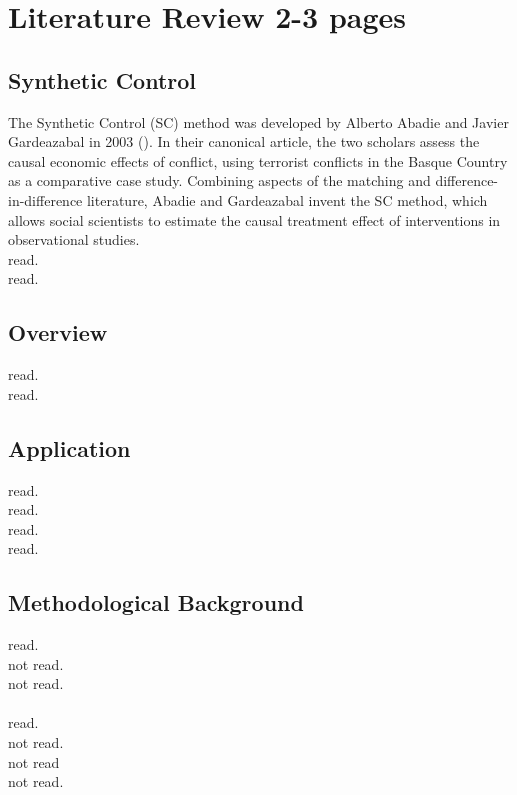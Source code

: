 \section{Literature Review 2-3 pages}

\subsection{Synthetic Control}
The Synthetic Control (SC) method was developed by Alberto Abadie and Javier Gardeazabal in 2003 (\cite{abadie:2003}). In their canonical article, the two scholars assess the causal economic effects of conflict, using terrorist conflicts in the Basque Country as a comparative case study. Combining aspects of the matching and difference-in-difference literature, Abadie and Gardeazabal invent the SC method, which allows social scientists to estimate the causal treatment effect of interventions in observational studies. 
\\
\cite{abadie:2007} read.\\
\cite{abadie:2015} read.

\subsection{Overview}
\cite{abadie:2021a} read.\\
\cite{athey:2016} read.

\subsection{Application}
\cite{born:2019} read. \\
\cite{cho:2020} read.\\
\cite{cunningham:2021} read.\\
\cite{funke:2020} read.

\subsection{Methodological Background}
\cite{abadie:2011} read.\\
\cite{abadie:2006} not read.\\
\cite{abadie:2002} not read.\\
\cite{doudchenko:2016} \\
\cite{ferman:2021} read.\\
\cite{frangakis:2002} not read.\\
\cite{rosenbaum:1983} not read \\
\cite{rubin:1974} not read.

